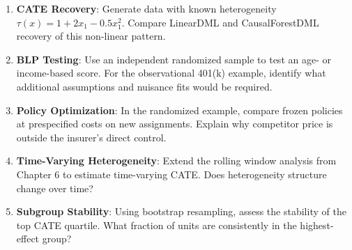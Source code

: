 \begin{enumerate}
    \item \textbf{CATE Recovery}: Generate data with known heterogeneity $\tau(x) = 1 + 2x_1 - 0.5x_1^2$. Compare LinearDML and CausalForestDML recovery of this non-linear pattern.

    \item \textbf{BLP Testing}: Use an independent randomized sample to test an age- or income-based score. For the observational 401(k) example, identify what additional assumptions and nuisance fits would be required.

    \item \textbf{Policy Optimization}: In the randomized example, compare frozen policies at prespecified costs on new assignments. Explain why competitor price is outside the insurer's direct control.

    \item \textbf{Time-Varying Heterogeneity}: Extend the rolling window analysis from Chapter 6 to estimate time-varying CATE. Does heterogeneity structure change over time?

    \item \textbf{Subgroup Stability}: Using bootstrap resampling, assess the stability of the top CATE quartile. What fraction of units are consistently in the highest-effect group?
\end{enumerate}
